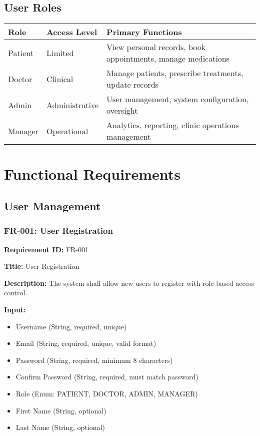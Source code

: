 \documentclass[12pt,a4paper]{article}
\begin{document}
\subsection{User Roles}

\begin{longtable}{|p{2cm}|p{3cm}|p{9cm}|}
\hline
\textbf{Role} & \textbf{Access Level} & \textbf{Primary Functions} \\
\hline
Patient & Limited & View personal records, book appointments, manage medications \\
\hline
Doctor & Clinical & Manage patients, prescribe treatments, update records \\
\hline
Admin & Administrative & User management, system configuration, oversight \\
\hline
Manager & Operational & Analytics, reporting, clinic operations management \\
\hline
\end{longtable}

\section{Functional Requirements}

\subsection{User Management}

\subsubsection{FR-001: User Registration}

\textbf{Requirement ID:} FR-001

\textbf{Title:} User Registration

\textbf{Description:} The system shall allow new users to register with role-based access control.

\textbf{Input:}
\begin{itemize}
    \item Username (String, required, unique)
    \item Email (String, required, unique, valid format)
    \item Password (String, required, minimum 8 characters)
    \item Confirm Password (String, required, must match password)
    \item Role (Enum: PATIENT, DOCTOR, ADMIN, MANAGER)
    \item First Name (String, optional)
    \item Last Name (String, optional)
\end{itemize}
\end{document}
